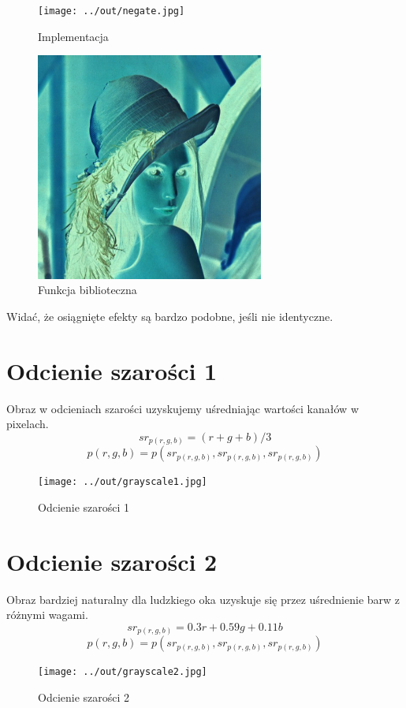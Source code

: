 \documentclass[a4paper,12pt]{article}
\begin{document}
\begin{figure}
\begin{minipage}[t]{7.5cm}
\begin{center}
\texttt{[image: ../out/negate.jpg]}
\caption{Implementacja}
\end{center}
\end{minipage}
\hfill
\begin{minipage}[t]{7.5cm}
\begin{center}
\includegraphics[width=7.5cm,clip]{grafika/negate_magick.jpg}
\caption{Funkcja biblioteczna}
\end{center}
\end{minipage}
\end{figure} 

Widać, że osiągnięte efekty są bardzo podobne, jeśli nie identyczne.





\newpage
\section{Odcienie szarości 1}
Obraz w odcieniach szarości uzyskujemy uśredniając wartości kanałów w pixelach.
$$sr_{p(r,g,b)} = (r + g + b) / 3$$
$$p(r, g, b) = p( sr_{p(r,g,b)}, sr_{p(r,g,b)}, sr_{p(r,g,b)})$$
\begin{figure}[h!]
   \centering
   \texttt{[image: ../out/grayscale1.jpg]}
   \caption{Odcienie szarości 1}
\end{figure}



\newpage
\section{Odcienie szarości 2}
Obraz bardziej naturalny dla ludzkiego oka uzyskuje się przez uśrednienie barw z różnymi wagami.
$$sr_{p(r,g,b)} = 0.3r + 0.59g + 0.11b$$
$$p(r, g, b) = p( sr_{p(r,g,b)}, sr_{p(r,g,b)}, sr_{p(r,g,b)})$$
\begin{figure}[h!]
   \centering
   \texttt{[image: ../out/grayscale2.jpg]}
   \caption{Odcienie szarości 2}
\end{figure}

\end{document}
